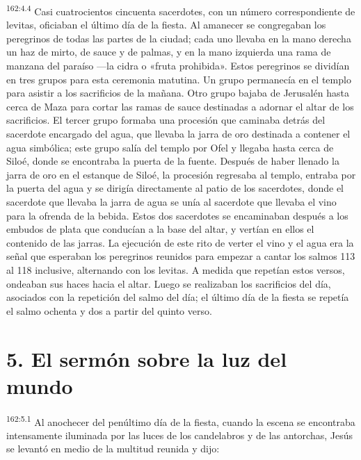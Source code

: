 \par 
\textsuperscript{162:4.4} Casi cuatrocientos cincuenta sacerdotes, con un número correspondiente de levitas, oficiaban el último día de la fiesta. Al amanecer se congregaban los peregrinos de todas las partes de la ciudad; cada uno llevaba en la mano derecha un haz de mirto, de sauce y de palmas, y en la mano izquierda una rama de manzana del paraíso ---la cidra o «fruta prohibida». Estos peregrinos se dividían en tres grupos para esta ceremonia matutina. Un grupo permanecía en el templo para asistir a los sacrificios de la mañana. Otro grupo bajaba de Jerusalén hasta cerca de Maza para cortar las ramas de sauce destinadas a adornar el altar de los sacrificios. El tercer grupo formaba una procesión que caminaba detrás del sacerdote encargado del agua, que llevaba la jarra de oro destinada a contener el agua simbólica; este grupo salía del templo por Ofel y llegaba hasta cerca de Siloé, donde se encontraba la puerta de la fuente. Después de haber llenado la jarra de oro en el estanque de Siloé, la procesión regresaba al templo, entraba por la puerta del agua y se dirigía directamente al patio de los sacerdotes, donde el sacerdote que llevaba la jarra de agua se unía al sacerdote que llevaba el vino para la ofrenda de la bebida. Estos dos sacerdotes se encaminaban después a los embudos de plata que conducían a la base del altar, y vertían en ellos el contenido de las jarras. La ejecución de este rito de verter el vino y el agua era la señal que esperaban los peregrinos reunidos para empezar a cantar los salmos
113 al 118 inclusive, alternando con los levitas. A medida que repetían estos versos, ondeaban sus haces hacia el altar. Luego se realizaban los sacrificios del día, asociados con la repetición del salmo del día; el último día de la fiesta se repetía el salmo ochenta y dos a partir del quinto verso.

\section*{5. El sermón sobre la luz del mundo}
\par 
\textsuperscript{162:5.1} Al anochecer del penúltimo día de la fiesta, cuando la escena se encontraba intensamente iluminada por las luces de los candelabros y de las antorchas, Jesús se levantó en medio de la multitud reunida y dijo:

